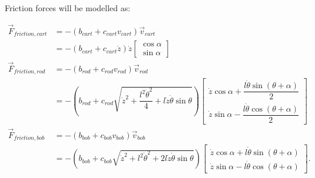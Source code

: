 \documentclass[12pt,a4paper,portrait]{article}
\begin{document}
	Friction forces will be modelled as:
	
	\begin{align*}
		\vec{F}_{friction, cart} &= -(b_{cart}+c_{cart}v_{cart})\vec{v}_{cart} \\
		&= -(b_{cart} + c_{cart}\dot{z})\dot{z}\begin{bmatrix}
			\cos{\alpha} \\
			\sin{\alpha}
		\end{bmatrix} \\
		\vec{F}_{friction,rod} &= -(b_{rod}+c_{rod}v_{rod})\vec{v}_{rod} \\
		&= -\left(b_{rod} + c_{rod}\sqrt{\dot{z}^2+\dfrac{l^2\dot{\theta}^2}{4}+l\dot{z}\dot{\theta}\sin{\theta}}\right)\begin{bmatrix}
			\dot{z}\cos{\alpha} + \dfrac{l\dot{\theta}\sin{(\theta+\alpha)}}{2}\\
			\dot{z}\sin{\alpha} - \dfrac{l\dot{\theta}\cos{(\theta+\alpha)}}{2}
		\end{bmatrix}\\
		\vec{F}_{friction,bob} &= -(b_{bob}+c_{bob}v_{bob})\vec{v}_{bob} \\
		&= -\left(b_{bob} + c_{bob}\sqrt{\dot{z}^2+l^2\dot{\theta}^2+2l\dot{z}\dot{\theta}\sin{\theta}}\right)\begin{bmatrix}
			\dot{z}\cos{\alpha} + l\dot{\theta}\sin{(\theta+\alpha)}\\
			\dot{z}\sin{\alpha} - l\dot{\theta}\cos{(\theta+\alpha)}
		\end{bmatrix}.
	\end{align*}
	
\end{document}
